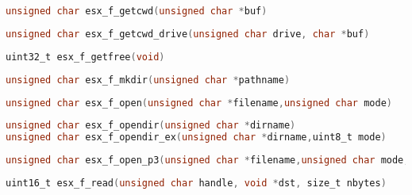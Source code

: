 \documentclass[11pt]{book}
\def\lthtmlcheckvsize{\ifdim\ht\sizebox<\vsize 
  \ifdim\wd\sizebox<\hsize\expandafter\hfill\fi \expandafter\vfill
  \else\expandafter\vss\fi}%
\begin{document}
{\newpage\clearpage
{}%
\begin{lstlisting}[language=C]
unsigned char esx_f_getcwd(unsigned char *buf)
\end{lstlisting}%
\lthtmlfigureZ
\lthtmlcheckvsize\clearpage}

{\newpage\clearpage
{}%
\begin{lstlisting}[language=C]
unsigned char esx_f_getcwd_drive(unsigned char drive, char *buf)
\end{lstlisting}%
\lthtmlfigureZ
\lthtmlcheckvsize\clearpage}

{\newpage\clearpage
{}%
\begin{lstlisting}[language=C]
uint32_t esx_f_getfree(void)
\end{lstlisting}%
\lthtmlfigureZ
\lthtmlcheckvsize\clearpage}

{\newpage\clearpage
{}%
\begin{lstlisting}[language=C]
unsigned char esx_f_mkdir(unsigned char *pathname)
\end{lstlisting}%
\lthtmlfigureZ
\lthtmlcheckvsize\clearpage}

{\newpage\clearpage
{}%
\begin{lstlisting}[language=C]
unsigned char esx_f_open(unsigned char *filename,unsigned char mode)
\end{lstlisting}%
\lthtmlfigureZ
\lthtmlcheckvsize\clearpage}

{\newpage\clearpage
{}%
\begin{lstlisting}[language=C]
unsigned char esx_f_opendir(unsigned char *dirname)
unsigned char esx_f_opendir_ex(unsigned char *dirname,uint8_t mode)
\end{lstlisting}%
\lthtmlfigureZ
\lthtmlcheckvsize\clearpage}

{\newpage\clearpage
{}%
\begin{lstlisting}[language=C]
unsigned char esx_f_open_p3(unsigned char *filename,unsigned char mode,struct esx_p3_hdr *h)
\end{lstlisting}%
\lthtmlfigureZ
\lthtmlcheckvsize\clearpage}

{\newpage\clearpage
{}%
\begin{lstlisting}[language=C]
uint16_t esx_f_read(unsigned char handle, void *dst, size_t nbytes)
\end{lstlisting}%
\lthtmlfigureZ
\lthtmlcheckvsize\clearpage}
\end{document}
